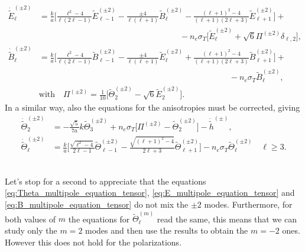 \begin{subequations}\label{eq:EB_multipole_equations_tensor}
    \begin{align}
        \dot{\tilde E}_\ell^{(\pm2)}&=\frac{k}{a}\bigg[\frac{\ell^2-4}{\ell(2\ell-1)}\tilde E_{\ell-1}^{(\pm2)}-\frac{\pm4}{\ell(\ell+1)}\tilde B_\ell^{(\pm2)}-\frac{(\ell+1)^2-4}{(\ell+1)(2\ell+3)}\tilde E_{\ell+1}^{(\pm2)}\bigg]+\nonumber\\&\qquad\qquad\qquad\qquad\qquad\qquad\qquad\qquad\quad-n_e\sigma_T\bigg[\tilde E_{\ell}^{(\pm2)}+\sqrt{6}\Pi^{(\pm2)}\delta_{\ell,2}\bigg],\label{eq:E_multipole_equation_tensor}\\
        \dot{\tilde B}_\ell^{(\pm2)}&=\frac{k}{a}\bigg[\frac{\ell^2-4}{\ell(2\ell-1)}\tilde B_{\ell-1}^{(\pm2)}-\frac{\pm4}{\ell(\ell+1)}\tilde E_\ell^{(\pm2)}+\frac{(\ell+1)^2-4}{(\ell+1)(2\ell+3)}\tilde B_{\ell+1}^{(\pm2)}\bigg]+\nonumber\\&\qquad\qquad\qquad\qquad\qquad\qquad\qquad\qquad\qquad\qquad\qquad\quad-n_e\sigma_T\tilde B_{\ell}^{(\pm2)},\label{eq:B_multipole_equation_tensor}\\
        \nonumber &\text{with}\quad\Pi^{(\pm2)}=\frac{1}{10}\bigg[\tilde\Theta_2^{(\pm2)}-\sqrt{6}\tilde E_2^{(\pm2)}\bigg].
    \end{align}
\end{subequations}
In a similar way, also the equations for the anisotropies must be corrected, giving
\begin{subequations}\label{eq:Theta_multipole_equation_tensor}
    \begin{align}\label{eq:Theta_multipole_equation_tensor_l=2}
    \dot{\tilde\Theta}_2^{(\pm2)}&=-\frac{\sqrt{5}}{7a}k\tilde\Theta_3^{(\pm2)}+n_e\sigma_T\bigg[\Pi^{(\pm2)}-\tilde\Theta_{2}^{(\pm2)}\bigg]-\dot{\tilde h}^{(\pm)},\\\label{eq:Theta_multipole_equation_tensor_l>2}
    \dot{\tilde\Theta}_\ell^{(\pm2)}&=\frac{k}{a}\bigg[\frac{\sqrt{\ell^2-4}}{2\ell-1}\tilde\Theta_{\ell-1}^{(\pm2)}-\frac{\sqrt{(\ell+1)^2-4}}{2\ell+3}\tilde\Theta_{\ell+1}^{(\pm2)}\bigg]-n_e\sigma_T\tilde\Theta_{\ell}^{(\pm2)}\quad \ell\geq3.
\end{align}
\end{subequations}
\

Let's stop for a second to appreciate that the equations \eqref{eq:Theta_multipole_equation_tensor}, \eqref{eq:E_multipole_equation_tensor} and \eqref{eq:B_multipole_equation_tensor} do not mix the $\pm2$ modes. Furthermore, for both values of $m$ the equations for $\tilde\Theta_\ell^{(m)}$ read the same, this means that we can study only the $m=2$ modes and then use the results to obtain the $m=-2$ ones. However this does not hold for the polarizations.

